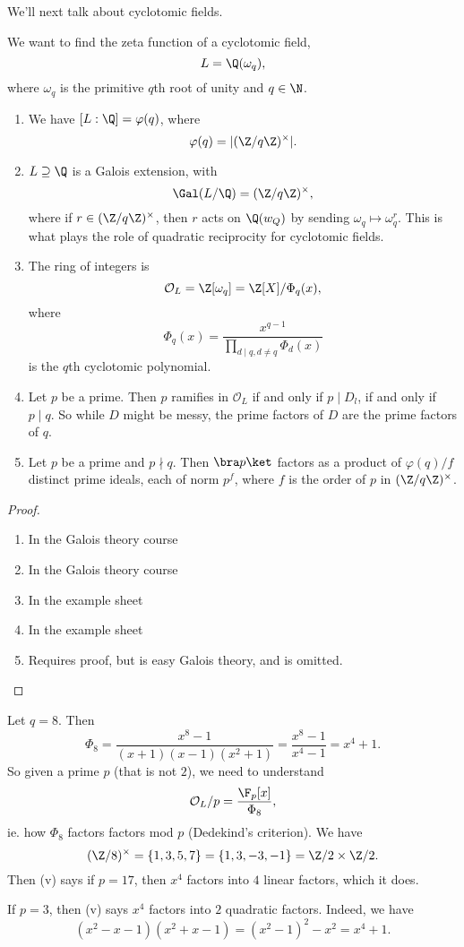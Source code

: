 \documentclass[a4paper]{article}
\begin{document}
We'll next talk about cyclotomic fields.

We want to find the zeta function of a cyclotomic field,
\[
  L = \Q(\omega_q),
\]
where $\omega_q$ is the primitive $q$th root of unity and $q\in \N$.
\begin{prop}\leavevmode
  \begin{enumerate}
    \item We have $[L:\Q] = \varphi(q)$, where
      \[
        \varphi(q) = |(\Z/q\Z)^\times|.
      \]
    \item $L \supseteq \Q$ is a Galois extension, with
      \[
        \Gal(L/\Q) = (\Z/q\Z)^\times,
      \]
      where if $r \in (\Z/q\Z)^\times$, then $r$ acts on $\Q(w_Q)$ by sending $\omega_q \mapsto \omega_q^r$. This is what plays the role of quadratic reciprocity for cyclotomic fields.
    \item The ring of integers is
      \[
        \mathcal{O}_L = \Z[\omega_q] = \Z[X]/\Phi_q(x),
      \]
      where
      \[
        \Phi_q(x) = \frac{x^{q - 1}}{\prod_{d \mid q, d \not= q}\Phi_d(x)}
      \]
      is the $q$th cyclotomic polynomial.
    \item Let $p$ be a prime. Then $p$ ramifies in $\mathcal{O}_L$ if and only if $p \mid D_l$, if and only if $p \mid q$. So while $D$ might be messy, the prime factors of $D$ are the prime factors of $q$.
    \item Let $p$ be a prime and $p \nmid q$. Then $\bra p\ket$ factors as a product of $\varphi(q)/f$ distinct prime ideals, each of norm $p^f$, where $f$ is the order of $p$ in $(\Z/q\Z)^{\times}$.
  \end{enumerate}
\end{prop}

\begin{proof}\leavevmode
  \begin{enumerate}
    \item In the Galois theory course
    \item In the Galois theory course
    \item In the example sheet
    \item In the example sheet
    \item Requires proof, but is easy Galois theory, and is omitted.
  \end{enumerate}
\end{proof}

\begin{eg}
  Let $q = 8$. Then
  \[
    \Phi_8 = \frac{x^8 - 1}{(x + 1)(x - 1)(x^2 + 1)} = \frac{x^8 - 1}{x^4 - 1} = x^4 + 1.
  \]
  So given a prime $p$ (that is not $2$), we need to understand
  \[
    \mathcal{O}_L/p = \frac{\F_p[x]}{\Phi_8},
  \]
  ie. how $\Phi_8$ factors factors mod $p$ (Dedekind's criterion). We have
  \[
    (\Z/8)^\times = \{1, 3, 5, 7\} = \{1, 3, -3, -1\} = \Z/2 \times \Z/2.
  \]
  Then (v) says if $p = 17$, then $x^4$ factors into $4$ linear factors, which it does.

  If $p = 3$, then (v) says $x^4$ factors into $2$ quadratic factors. Indeed, we have
  \[
    (x^2 - x - 1)(x^2 + x - 1) = (x^2 - 1)^2 - x^2 = x^4 + 1.
  \]
\end{eg}
\end{document}
